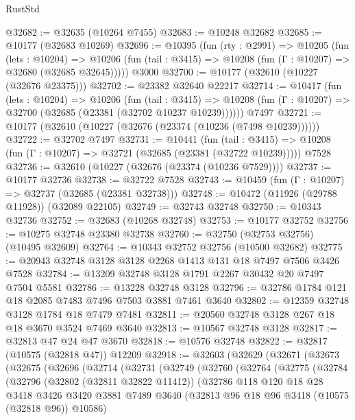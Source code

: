 \begin{lexlean}{RustStd}
\begin{coremodule}
@32682 := @32635 (@10264 @7455)
@32683 := @10248 @32682
@32685 := @10177 (@32683 @10269)
@32696 := @10395
    (fun (rty : @2991) =>
    @10205
      (fun (lets : @10204) =>
      @10206 (fun (tail : @3415) => @10208 (fun (Γ : @10207) => @32680 (@32685 @32645)))))
    @3000
@32700 := @10177 (@32610 (@10227 (@32676 @23375)))
@32702 := @23382 @32640 @22217
@32714 := @10417
    (fun (lets : @10204) =>
    @10206
      (fun (tail : @3415) =>
      @10208 (fun (Γ : @10207) => @32700 (@32685 (@23381 (@32702 @10237 @10239))))))
    @7497
@32721 := @10177 (@32610 (@10227 (@32676 (@23374 (@10236 (@7498 @10239))))))
@32722 := @32702 @7497
@32731 := @10441
    (fun (tail : @3415) => @10208 (fun (Γ : @10207) => @32721 (@32685 (@23381 (@32722 @10239)))))
    @7528
@32736 := @32610 (@10227 (@32676 (@23374 (@10236 @7529))))
@32737 := @10177 @32736
@32738 := @32722 @7528
@32743 := @10459 (fun (Γ : @10207) => @32737 (@32685 (@23381 @32738)))
@32748 := @10472 (@11926 (@29788 @11928)) (@32089 @22105)
@32749 := @32743 @32748
@32750 := @10343 @32736
@32752 := @32683 (@10268 @32748)
@32753 := @10177 @32752
@32756 := @10275 @32748 @23380 @32738
@32760 := @32750 (@32753 @32756) (@10495 @32609)
@32764 := @10343 @32752 @32756 (@10500 @32682)
@32775 := @20943 @32748 @3128 @3128 @2268 @1413 @131 @18 @7497 @7506 @3426 @7528
@32784 := @13209 @32748 @3128 @1791 @2267 @30432 @20 @7497 @7504 @5581
@32786 := @13228 @32748 @3128
@32796 := @32786 @1784 @121 @18 @2085 @7483 @7496 @7503 @3881 @7461 @3640
@32802 := @12359 @32748 @3128 @1784 @18 @7479 @7481
@32811 := @20560 @32748 @3128 @267 @18 @18 @3670 @3524 @7469 @3640
@32813 := @10567 @32748 @3128
@32817 := @32813 @47 @24 @47 @3670
@32818 := @10576 @32748
@32822 := @32817 (@10575 (@32818 @47)) @12209
@32918 := @32603
    (@32629
      (@32671
        (@32673
          (@32675
            (@32696
              (@32714
                (@32731
                  (@32749
                    (@32760
                      (@32764
                        (@32775
                          (@32784
                            (@32796
                              (@32802 (@32811 @32822 @11412))
                              (@32786
                                @118
                                @120
                                @18
                                @28
                                @3418
                                @3426
                                @3420
                                @3881
                                @7489
                                @3640
                                (@32813 @96 @18 @96 @3418 (@10575 (@32818 @96)) @10586)

\end{coremodule}
\end{lexlean}
